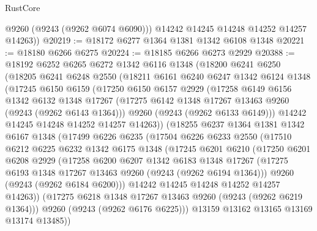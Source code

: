 \begin{lexlean}{RustCore}
\begin{coremodule}
          @9260
          (@9243 (@9262 @6074 @6090)))
        @14242
        @14245
        @14248
        @14252
        @14257
        @14263))
@20219 := @18172 @6277 @1364 @1381 @1342 @6108 @1348
@20221 := @18180 @6266 @6275
@20224 := @18185 @6266 @6273 @2929
@20388 := @18192
    @6252
    @6265
    @6272
    @1342
    @6116
    @1348
    (@18200
      @6241
      @6250
      (@18205
        @6241
        @6248
        @2550
        (@18211
          @6161
          @6240
          @6247
          @1342
          @6124
          @1348
          (@17245
            @6150
            @6159
            (@17250
              @6150
              @6157
              @2929
              (@17258
                @6149
                @6156
                @1342
                @6132
                @1348
                @17267
                (@17275 @6142 @1348 @17267 @13463 @9260 (@9243 (@9262 @6143 @1364)))
                @9260
                (@9243 (@9262 @6133 @6149)))
              @14242
              @14245
              @14248
              @14252
              @14257
              @14263))
          (@18255
            @6237
            @1364
            @1381
            @1342
            @6167
            @1348
            (@17499
              @6226
              @6235
              (@17504
                @6226
                @6233
                @2550
                (@17510
                  @6212
                  @6225
                  @6232
                  @1342
                  @6175
                  @1348
                  (@17245
                    @6201
                    @6210
                    (@17250
                      @6201
                      @6208
                      @2929
                      (@17258
                        @6200
                        @6207
                        @1342
                        @6183
                        @1348
                        @17267
                        (@17275 @6193 @1348 @17267 @13463 @9260 (@9243 (@9262 @6194 @1364)))
                        @9260
                        (@9243 (@9262 @6184 @6200)))
                      @14242
                      @14245
                      @14248
                      @14252
                      @14257
                      @14263))
                  (@17275 @6218 @1348 @17267 @13463 @9260 (@9243 (@9262 @6219 @1364)))
                  @9260
                  (@9243 (@9262 @6176 @6225)))
                @13159
                @13162
                @13165
                @13169
                @13174
                @13485))

\end{coremodule}
\end{lexlean}

